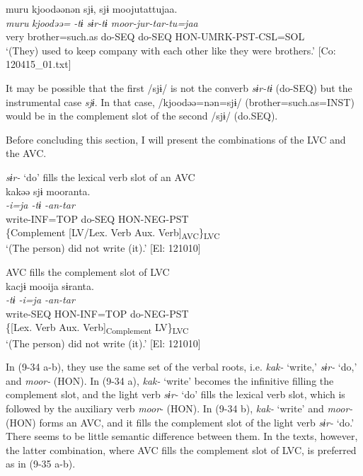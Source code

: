 \ea   \label{ex:9.33}
\glll  muru  kjoodəənən  sjɨ,  sjɨ  moojutattujaa.\\
    \textit{muru}  \textit{kjoodəə=}  \textit{-tɨ  sɨr-tɨ  moor-jur-tar-tu=jaa}\\
    very  brother=such.as  do-SEQ  do-SEQ  HON-UMRK-PST-CSL=SOL\\
    \glt     ‘(They) used to keep company with each other like they were brothers.’ [Co: 120415\_01.txt]
\z

It may be possible that the first /sjɨ/ is not the converb \textit{sɨr-tɨ} (do-SEQ) but the instrumental case \textit{sjɨ}. In that case, /kjoodəə=nən=sjɨ/ (brother=such.as=INST) would be in the complement slot of the second /sjɨ/ (do.SEQ).

Before concluding this section, I will present the combinations of the LVC and the AVC.

\ea   \label{ex:9.34}
\ea \textit{sɨr-} ‘do’ fills the lexical verb slot of an AVC \label{ex:9.34a}\\
 \gllll  kakəə  sjɨ  mooranta.\\
    \textit{-i=ja  -tɨ  -an-tar}\\
    write-INF=TOP  do-SEQ  HON-NEG-PST\\
    \{Complement  [LV/Lex. Verb  Aux. Verb]\textsubscript{AVC}\}\textsubscript{LVC}\\
    \glt     ‘(The person) did not write (it).’ [El: 121010]

\ex AVC fills the complement slot of LVC\label{ex:9.34b}\\
 \gllll  kacjɨ  mooija  sɨranta.\\
    \textit{-tɨ  -i=ja  -an-tar}\\
    write-SEQ  HON-INF=TOP  do-NEG-PST\\
    \{[Lex. Verb  Aux. Verb]\textsubscript{Complement}  LV\}\textsubscript{LVC}\\
    \glt     ‘(The person) did not write (it).’ [El: 121010]
    \z
\z

In (9-34 a-b), they use the same set of the verbal roots, i.e. \textit{kak-} ‘write,’ \textit{sɨr-} ‘do,’ and \textit{moor-} (HON). In (9-34 a), \textit{kak-} ‘write’ becomes the infinitive filling the complement slot, and the light verb \textit{sɨr-} ‘do’ fills the lexical verb slot, which is followed by the auxiliary verb \textit{moor}{}- (HON). In (9-34 b), \textit{kak-} ‘write’ and \textit{moor-} (HON) forms an AVC, and it fills the complement slot of the light verb \textit{sɨr-} ‘do.’ There seems to be little semantic difference between them. In the texts, however, the latter combination, where AVC fills the complement slot of LVC, is preferred as in (9-35 a-b).

